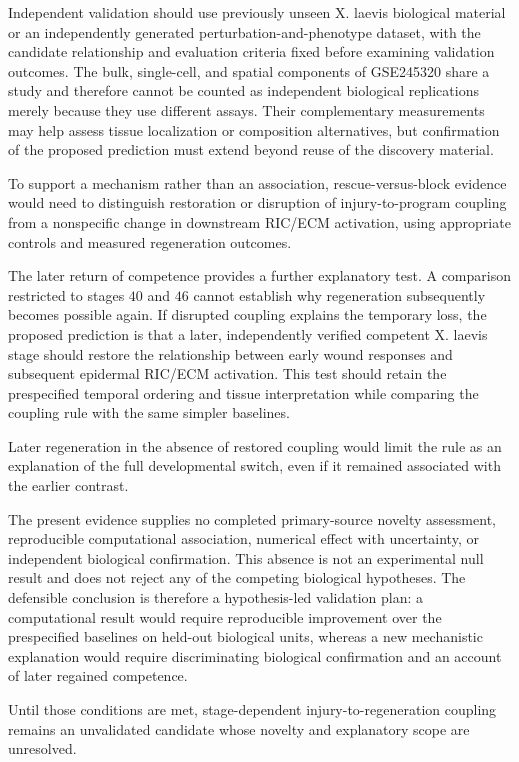 \documentclass[11pt]{article}
\begin{document}
Independent validation should use previously unseen X. laevis biological material or an independently generated perturbation-and-phenotype dataset, with the candidate relationship and evaluation criteria fixed before examining validation outcomes. The bulk, single-cell, and spatial components of GSE245320 share a study and therefore cannot be counted as independent biological replications merely because they use different assays. Their complementary measurements may help assess tissue localization or composition alternatives, but confirmation of the proposed prediction must extend beyond reuse of the discovery material.

To support a mechanism rather than an association, rescue-versus-block evidence would need to distinguish restoration or disruption of injury-to-program coupling from a nonspecific change in downstream RIC/ECM activation, using appropriate controls and measured regeneration outcomes.

The later return of competence provides a further explanatory test. A comparison restricted to stages $40$ and $46$ cannot establish why regeneration subsequently becomes possible again. If disrupted coupling explains the temporary loss, the proposed prediction is that a later, independently verified competent X. laevis stage should restore the relationship between early wound responses and subsequent epidermal RIC/ECM activation. This test should retain the prespecified temporal ordering and tissue interpretation while comparing the coupling rule with the same simpler baselines.

Later regeneration in the absence of restored coupling would limit the rule as an explanation of the full developmental switch, even if it remained associated with the earlier contrast.

The present evidence supplies no completed primary-source novelty assessment, reproducible computational association, numerical effect with uncertainty, or independent biological confirmation. This absence is not an experimental null result and does not reject any of the competing biological hypotheses. The defensible conclusion is therefore a hypothesis-led validation plan: a computational result would require reproducible improvement over the prespecified baselines on held-out biological units, whereas a new mechanistic explanation would require discriminating biological confirmation and an account of later regained competence.

Until those conditions are met, stage-dependent injury-to-regeneration coupling remains an unvalidated candidate whose novelty and explanatory scope are unresolved.
\end{document}
